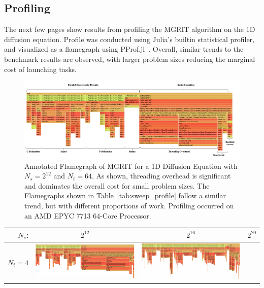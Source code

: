 \documentclass{article}
\begin{document}
\subsection{Profiling}

The next few pages show results from profiling the MGRIT algorithm on the 1D diffusion equation.
Profile was conducted using Julia's builtin statistical profiler, and visualized as a flamegraph using PProf.jl~\cite{PProfJl2022}.
Overall, similar trends to the benchmark results are observed, with larger problem sizes reducing the marginal cost of launching tasks.

\begin{landscape}
    \begin{figure}
        \centering
        \includegraphics[width=\linewidth]{docs/assets/profile/profile_annotated.png}
        \caption{Annotated Flamegraph of MGRIT for a 1D Diffusion Equation with \(N_s = 2^{12}\) and \(N_t = 64\).
        As shown, threading overhead is significant and dominates the overall cost for small problem sizes.
        The Flamegraphs shown in Table~\ref{tab:sweep_profile} follow a similar trend, but with different proportions of work.
        Profiling occurred on an AMD EPYC 7713 64-Core Processor.
        }\label{fig:profile_annotated}
    \end{figure}
    \begin{table}
        \centering
        \begin{tabular}[t]{rccc}
            \(N_s\): & \(2^{12}\) & \(2^{16}\) & \(2^{20}\) \\
            \midrule
            \(N_t = 4\) &
                \includegraphics[width=.27\linewidth,valign=t]{docs/assets/profile/ns_12_nt_4.png} &
                \includegraphics[width=.27\linewidth,valign=t]{docs/assets/profile/ns_16_nt_4.png} &

\end{tabular}
\end{table}
\end{landscape}
\end{document}
